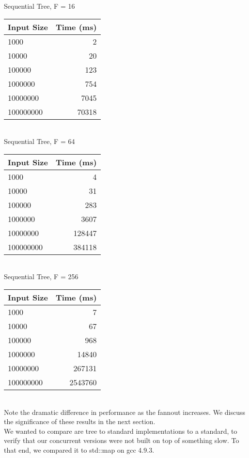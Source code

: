\documentclass{sig-alternate}
\begin{document}
Sequential Tree, F = 16\\
\begin{tabular}{| l | r |}
  \hline
  Input Size & Time (ms)\\  \hline
  1000			&	2	\\
  10000			&	20	\\
  100000		&	123	\\
  1000000		&	754	\\
  10000000		&	7045	\\
  100000000		&	70318	\\
  \hline
\end{tabular} \\

Sequential Tree, F = 64\\
\begin{tabular}{| l | r |}
  \hline
  Input Size & Time (ms)\\  \hline
  1000			&	4	\\
  10000			&	31	\\
  100000		&	283	\\
  1000000		&	3607	\\
  10000000		&	128447	\\
  100000000		&	384118\\
  \hline
\end{tabular} \\

Sequential Tree, F = 256\\
\begin{tabular}{| l | r |}
  \hline
  Input Size & Time (ms)\\  \hline
  1000			&	7	\\
  10000			&	67	\\
  100000		&	968	\\
  1000000		&	14840	\\
  10000000		&	267131	\\
  100000000		&	2543760	\\
  \hline
\end{tabular}\\

Note the dramatic difference in performance as the fannout increases. 
We discuss the significance of these results in the next section.\\

We wanted to compare are tree to standard implementations to a standard, to verify that our concurrent versions were not built on top of something slow.  To that end, we compared it to std::map on gcc 4.9.3.
\end{document}
